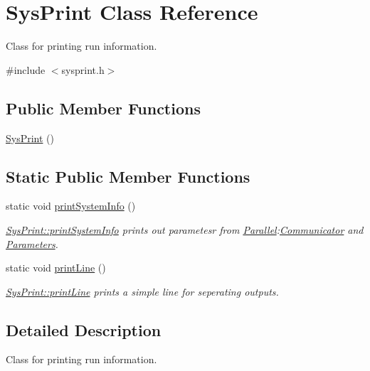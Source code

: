 \hypertarget{class_sys_print}{}\section{Sys\+Print Class Reference}
\label{class_sys_print}


Class for printing run information.  




{\ttfamily \#include $<$sysprint.\+h$>$}

\subsection*{Public Member Functions}
\begin{DoxyCompactItemize}
\item 
\mbox{\hyperlink{class_sys_print_a205d71843ed2243d76300df6b854bed8}{Sys\+Print}} ()
\end{DoxyCompactItemize}
\subsection*{Static Public Member Functions}
\begin{DoxyCompactItemize}
\item 
static void \mbox{\hyperlink{class_sys_print_a4572572643f6f4685081a3ae419e5ca9}{print\+System\+Info}} ()
\begin{DoxyCompactList}\small\item\em \mbox{\hyperlink{class_sys_print_a4572572643f6f4685081a3ae419e5ca9}{Sys\+Print\+::print\+System\+Info}} prints out parametesr from \mbox{\hyperlink{namespace_parallel}{Parallel}}\+:\mbox{\hyperlink{class_communicator}{Communicator}} and \mbox{\hyperlink{class_parameters}{Parameters}}. \end{DoxyCompactList}\item 
static void \mbox{\hyperlink{class_sys_print_abdf8282e73cc002e5e572c6f09266cc9}{print\+Line}} ()
\begin{DoxyCompactList}\small\item\em \mbox{\hyperlink{class_sys_print_abdf8282e73cc002e5e572c6f09266cc9}{Sys\+Print\+::print\+Line}} prints a simple line for seperating outputs. \end{DoxyCompactList}\end{DoxyCompactItemize}


\subsection{Detailed Description}
Class for printing run information. 


